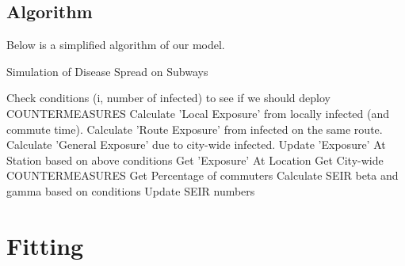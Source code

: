 \documentclass[12pt, a4, epsf] {article}
\theoremstyle{plain}
\theoremstyle{definition}
\begin{document}
\subsection{Algorithm}
Below is a simplified algorithm of our model.
\begin{algorithm}
\caption{Simulation of Disease Spread on Subways}\label{euclid}
\begin{algorithmic}[1]
    \State Check conditions (i, number of infected) to see if we should deploy COUNTERMEASURES
        \State Calculate 'Local Exposure' from locally infected (and commute time).
        \State Calculate 'Route Exposure' from infected on the same route.
        \State Calculate 'General Exposure' due to city-wide infected.
        \State Update 'Exposure' At Station based on above conditions
    \EndFor
        \State Get 'Exposure' At Location
        \State Get City-wide COUNTERMEASURES
        \State Get Percentage of commuters
        \State Calculate SEIR beta and gamma based on conditions
        \State Update SEIR numbers
    \EndFor
\EndFor
\end{algorithmic}
\end{algorithm}
\section{Fitting}
\end{document}

